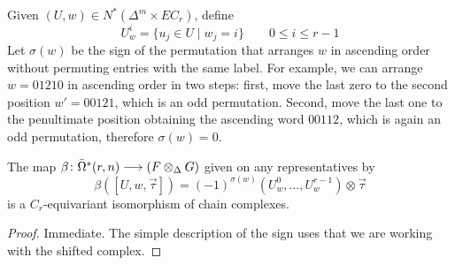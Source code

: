 Given $(U,w)\in N^*(\Delta^m\times EC_r)$, define
\[U_w^i = \{u_j\in U\mid w_j=i\} \qquad 0\leq i\leq r-1\]
Let $\sigma(w)$ be the sign of the permutation that arranges $w$ in ascending order without permuting entries with the same label. For example, we can arrange $w=01210$ in ascending order in two steps: first, move the last zero to the second position $w' = 00121$, which is an odd permutation. Second, move the last one to the penultimate position obtaining the ascending word $00112$, which is again an odd permutation, therefore $\sigma(w) = 0$.
\begin{lemma}
	The map $\beta\colon \bar{\Omega}^*(r,n)\longrightarrow (F\otimes_\Delta G)$ given on any representatives by
	\[\beta([U,w,\vec{\tau}]) = (-1)^{\sigma(w)}(U_w^0,\ldots, U_w^{r-1})\otimes \vec{\tau}\]
	is a $C_r$-equivariant isomorphism of chain complexes.
\end{lemma}
\begin{proof} Immediate. The simple description of the sign uses that we are working with the shifted complex.\qedhere


\end{proof}
